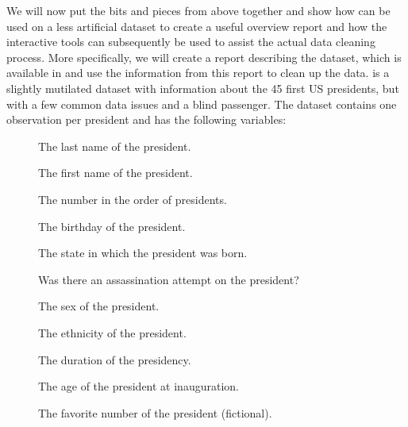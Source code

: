 \documentclass[article,shortnames]{jss}
\begin{document}
We will now put the bits and pieces from above together and show how  can be used on a less artificial dataset to create a useful overview report and how the interactive tools can subsequently be used to assist the actual data cleaning process. More specifically, we will create a report describing the  dataset, which is available in  and use the information from this report to clean up the data.  is a slightly mutilated dataset with information about the 45 first US presidents, but with a few common data issues and a blind passenger. The dataset contains one observation per president and has the following variables:
\begin{description}
\item[] The last name of the president.
\item[] The first name of the president.
\item[] The number in the order of presidents.
\item[] The birthday of the president.
\item[] The state in which the president was born.
\item[] Was there an assassination attempt on the president?
\item[] The sex of the president.
\item[] The ethnicity of the president.
\item[] The duration of the presidency.
\item[] The age of the president at inauguration.
\item[] The favorite number of the president (fictional).
\end{description}
\end{document}
